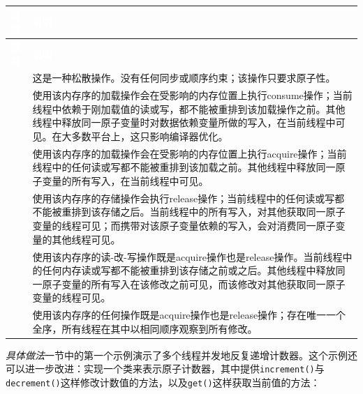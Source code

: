 \myTableBegin
\begin{xltabular}{\textwidth}{|>{\hsize\raggedright\arraybackslash}X|>{\hsize\raggedright\arraybackslash}X|}
\hline
{} \textcolor{white}{\textbf{模型}} & \textcolor{white}{\textbf{说明}} \\
\hline
\endfirsthead
{} \textcolor{white}{\textbf{模型}} & \textcolor{white}{\textbf{说明}} \\
\hline
\endhead
{} & 这是一种松散操作。没有任何同步或顺序约束；该操作只要求原子性。\\
\hline
{} & 使用该内存序的加载操作会在受影响的内存位置上执行consume操作；当前线程中依赖于刚加载值的读或写，都不能被重排到该加载操作之前。其他线程中释放同一原子变量时对数据依赖变量所做的写入，在当前线程中可见。在大多数平台上，这只影响编译器优化。\\
\hline
{} & 使用该内存序的加载操作会在受影响的内存位置上执行acquire操作；当前线程中的任何读或写都不能被重排到该加载之前。其他线程中释放同一原子变量的所有写入，在当前线程中可见。\\
\hline
{} & 使用该内存序的存储操作会执行release操作；当前线程中的任何读或写都不能被重排到该存储之后。当前线程中的所有写入，对其他获取同一原子变量的线程可见；而携带对该原子变量依赖的写入，会对消费同一原子变量的其他线程可见。\\
\hline
{} & 使用该内存序的读-改-写操作既是acquire操作也是release操作。当前线程中的任何内存读或写都不能被重排到该存储之前或之后。其他线程中释放同一原子变量的所有写入在该修改之前可见，而该修改对其他获取同一原子变量的线程可见。\\
\hline
{} & 使用该内存序的任何操作既是acquire操作也是release操作；存在唯一一个全序，所有线程在其中以相同顺序观察到所有修改。\\
\hline
\end{xltabular}
\myTableEnd






\textit{具体做法}一节中的第一个示例演示了多个线程并发地反复递增计数器。这个示例还可以进一步改进：实现一个类来表示原子计数器，其中提供\texttt{increment()}与\texttt{decrement()}这样修改计数值的方法，以及\texttt{get()}这样获取当前值的方法：


